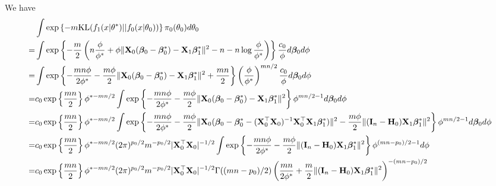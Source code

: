 \documentclass[11pt]{article}
\newcommand{\bfsym}[1]{\ensuremath{\boldsymbol{#1}}}
\def\bbeta{\bfsym \beta}
\theoremstyle{plain}
\theoremstyle{definition}
\theoremstyle{remark}
\begin{document}
We have
\begin{equation*}
    \begin{split}
    &\int \exp\left\{-m \text{KL}(f_1(x|\theta^*)||f_0(x|\theta_0))\right\} \pi_0(\theta_0) d\theta_0
    \\
    =&
    \int
    \exp\left\{
        -\frac m 2
    \left(
        n\frac{\phi}{\phi^*}
        +
            \phi\|\BX_0 (\bbeta_0-\bbeta_0^*) - \BX_1 \bbeta_1^*\|^2
            -n
        -n \log \frac{ \phi }{ \phi^* }
    \right)
\right\}
\frac{c_0}{\phi}
d\bbeta_0 d\phi
    \\
    =&
    \int
    \exp\left\{
        -\frac{mn\phi}{2\phi^*}
        -\frac{m\phi}{2}\|\BX_0 (\bbeta_0-\bbeta_0^*) - \BX_1 \bbeta_1^*\|^2
        +\frac{mn}{2}
\right\}
\left(\frac{\phi}{\phi^*}\right)^{mn/2}
\frac{c_0}{\phi}
d\bbeta_0 d\phi
    \\
    =&
    c_0
    \exp
    \left\{
        \frac{mn}{2}
    \right\}
    \phi^{*-mn/2}
    \int
    \exp\left\{
        -\frac{mn\phi}{2\phi^*}
        -\frac{m\phi}{2}\|\BX_0 (\bbeta_0-\bbeta_0^*) - \BX_1 \bbeta_1^*\|^2
\right\}
\phi^{mn/2-1}
d\bbeta_0 d\phi
    \\
    =&
    c_0
    \exp
    \left\{
        \frac{mn}{2}
    \right\}
    \phi^{*-mn/2}
    \int
    \exp\left\{
        -\frac{mn\phi}{2\phi^*}
        -\frac{m\phi}{2}\|\BX_0 (\bbeta_0-\bbeta_0^* - (\BX_0^\top \BX_0)^{-1}\BX_0^\top \BX_1 \bbeta_1^*) \|^2
        -\frac{m\phi}{2}\|(\BI_n- \BH_0) \BX_1 \bbeta_1^*\|^2
\right\}
\phi^{mn/2-1}
d\bbeta_0 d\phi
    \\
    =&
    c_0
    \exp
    \left\{
        \frac{mn}{2}
    \right\}
    \phi^{*-mn/2}
    (2\pi)^{p_0/2}
    m^{-p_0/2}
    |\BX_0^\top \BX_0|^{-1/2}
    \int
    \exp\left\{
        -\frac{mn\phi}{2\phi^*}
        -\frac{m\phi}{2}\|(\BI_n- \BH_0) \BX_1 \bbeta_1^*\|^2
\right\}
\phi^{(mn-p_0)/2-1}
 d\phi
    \\
    =&
    c_0
    \exp
    \left\{
        \frac{mn}{2}
    \right\}
    \phi^{*-mn/2}
    (2\pi)^{p_0/2}
    m^{-p_0/2}
    |\BX_0^\top \BX_0|^{-1/2}
    \Gamma((mn-p_0)/2)
    \left(
        \frac{mn}{2\phi^*}
        +\frac{m}{2}\|(\BI_n- \BH_0) \BX_1 \bbeta_1^*\|^2
    \right)^{-(mn-p_0)/2}
    \end{split}
\end{equation*}
\end{document}

